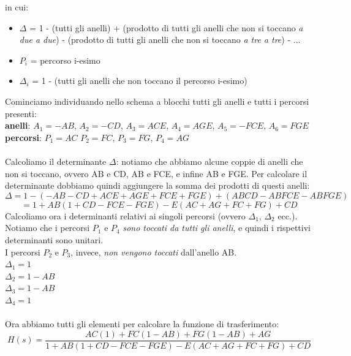 \documentclass[12pt,a4paper]{article}
\begin{document}
	in cui:
	\begin{itemize}
		\item $\Delta$ = 1 - (tutti gli anelli) + (prodotto di tutti gli anelli che non si toccano \textit{a due a due}) - (prodotto di tutti gli anelli che non si toccano \textit{a tre a tre}) - ...
		\item $P_i$ = percorso i-esimo
		\item $\Delta_i$ = 1 - (tutti gli anelli che non toccano il percorso i-esimo)
	\end{itemize}
	Cominciamo individuando nello schema a blocchi tutti gli anelli e tutti i percorsi presenti: \\
	\textbf{anelli}: $A_1 = -AB$, \quad $A_2 = -CD$, \quad $A_3 = ACE$, \quad $A_4 = AGE$, \quad $A_5 = -FCE$, \quad $A_6 = FGE$\\
	\textbf{percorsi}: $P_1 = AC$ \quad $P_2 = FC$, \quad $P_3 = FG$, \quad $P_4 = AG$	\\ \\
	Calcoliamo il determinante $\Delta $: notiamo che abbiamo alcune coppie di anelli che non si toccano, ovvero AB e CD, AB e FCE, e infine AB e FGE. Per calcolare il determinante dobbiamo quindi aggiungere la somma dei prodotti di questi anelli:
	\[
		\Delta = 1-(-AB-CD+ACE+AGE+FCE+FGE)+(ABCD-ABFCE-ABFGE)
	\]
	\[
		= 1 + AB(1+CD-FCE-FGE)-E(AC+AG+FC+FG)+CD
	\]
	Calcoliamo ora i determinanti relativi ai singoli percorsi (ovvero $\Delta_1$, $\Delta_2$ ecc.). Notiamo che i percorsi $P_1$ e $P_4$ \textit{sono toccati da tutti gli anelli}, e quindi i rispettivi determinanti sono unitari.\\
	I percorsi $P_2$ e $P_3$, invece, \textit{non vengono toccati} dall'anello AB.\\
	$\Delta_1 = 1$\\
	$\Delta_2 = 1-AB$ \\
	$\Delta_3 = 1-AB$ \\
	$\Delta_4 = 1$ \\ \\
	Ora abbiamo tutti gli elementi per calcolare la funzione di trasferimento:
	\[
		H(s) = \frac{AC(1) + FC(1-AB) + FG(1-AB) + AG}{1 + AB(1+CD-FCE-FGE)-E(AC+AG+FC+FG)+CD}
	\]
	\newpage
\end{document}
